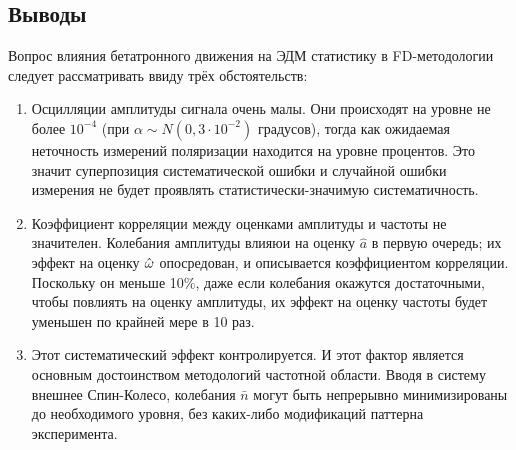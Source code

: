 \subsection{Выводы}
Вопрос влияния бетатронного движения на ЭДМ статистику в FD-методологии следует рассматривать
ввиду трёх обстоятельств:
\begin{enumerate}
\item Осцилляции амплитуды сигнала очень малы. Они происходят на уровне не более $10^{-4}$ (при
  $\alpha\sim N(0, 3\cdot 10^{-2})$ градусов), тогда как ожидаемая неточность измерений поляризации находится
  на уровне процентов. Это значит суперпозиция систематической ошибки и случайной ошибки измерения
  не будет проявлять статистически-значимую систематичность.
\item Коэффициент корреляции между оценками амплитуды и частоты не значителен. Колебания амплитуды
  влияюи на оценку $\hat a$ в первую очередь; их эффект на оценку $\hat{\omega}$ опосредован, и описывается
  коэффициентом корреляции. Поскольку он меньше 10\%, даже если колебания окажутся достаточными, чтобы повлиять
  на оценку амплитуды, их эффект на оценку частоты будет уменьшен по крайней мере в 10 раз.
\item Этот систематический эффект контролируется. И этот фактор является основным достоинством методологий
  частотной области. Вводя в систему внешнее Спин-Колесо, колебания $\bar n$ могут быть непрерывно минимизированы
  до необходимого уровня, без каких-либо модификаций паттерна эксперимента.
\end{enumerate}
